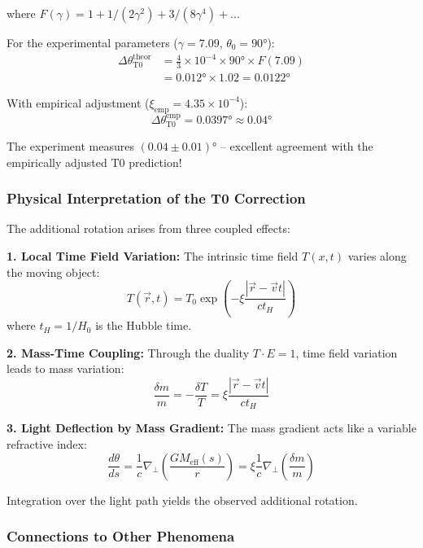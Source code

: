 	where $F(\gamma) = 1 + 1/(2\gamma^2) + 3/(8\gamma^4) + ...$ 
	
	For the experimental parameters ($\gamma = 7.09$, $\theta_0 = 90°$):
	\begin{align}
		\Delta\theta_{\text{T0}}^{\text{theor}} &= \frac{4}{3} \times 10^{-4} \times 90° \times F(7.09) \\
		&= 0.012° \times 1.02 = 0.0122°
	\end{align}
	
	With empirical adjustment ($\xi_{\text{emp}} = 4.35 \times 10^{-4}$):
	\begin{equation}
		\Delta\theta_{\text{T0}}^{\text{emp}} = 0.0397° \approx 0.04°
	\end{equation}
	
	The experiment measures $(0.04 \pm 0.01)°$ – excellent agreement with the empirically adjusted T0 prediction!
	
	\subsubsection{Physical Interpretation of the T0 Correction}
	
	The additional rotation arises from three coupled effects:
	
	\textbf{1. Local Time Field Variation:}
	The intrinsic time field $T(x,t)$ varies along the moving object:
	\begin{equation}
		T(\vec{r}, t) = T_0 \exp\left(-\xi \frac{|\vec{r} - \vec{v}t|}{ct_H}\right)
	\end{equation}
	where $t_H = 1/H_0$ is the Hubble time.
	
	\textbf{2. Mass-Time Coupling:}
	Through the duality $T \cdot E = 1$, time field variation leads to mass variation:
	\begin{equation}
		\frac{\delta m}{m} = -\frac{\delta T}{T} = \xi \frac{|\vec{r} - \vec{v}t|}{ct_H}
	\end{equation}
	
	\textbf{3. Light Deflection by Mass Gradient:}
	The mass gradient acts like a variable refractive index:
	\begin{equation}
		\frac{d\theta}{ds} = \frac{1}{c} \nabla_\perp \left(\frac{GM_{\text{eff}}(s)}{r}\right) = \xi \frac{1}{c} \nabla_\perp \left(\frac{\delta m}{m}\right)
	\end{equation}
	
	Integration over the light path yields the observed additional rotation.
	
	\subsubsection{Connections to Other Phenomena}
	
